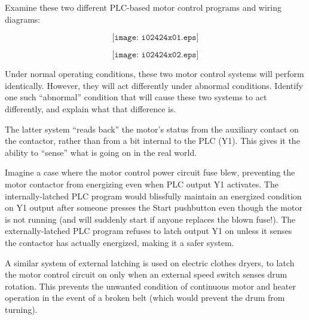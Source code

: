 

Examine these two different PLC-based motor control programs and wiring diagrams:

$$\texttt{[image: i02424x01.eps]}$$

\filbreak

$$\texttt{[image: i02424x02.eps]}$$

Under normal operating conditions, these two motor control systems will perform identically.  However, they will act differently under abnormal conditions.  Identify one such ``abnormal'' condition that will cause these two systems to act differently, and explain what that difference is.







The latter system ``reads back'' the motor's status from the auxiliary contact on the contactor, rather than from a bit internal to the PLC (Y1).  This gives it the ability to ``sense'' what is going on in the real world.

\vskip 10pt

Imagine a case where the motor control power circuit fuse blew, preventing the motor contactor from energizing even when PLC output Y1 activates.  The internally-latched PLC program would blissfully maintain an energized condition on Y1 output after someone presses the Start pushbutton even though the motor is not running (and will suddenly start if anyone replaces the blown fuse!).  The externally-latched PLC program refuses to latch output Y1 on unless it senses the contactor has actually energized, making it a safer system.

\vskip 10pt

A similar system of external latching is used on electric clothes dryers, to latch the motor control circuit on only when an external speed switch senses drum rotation.  This prevents the unwanted condition of continuous motor and heater operation in the event of a broken belt (which would prevent the drum from turning).






